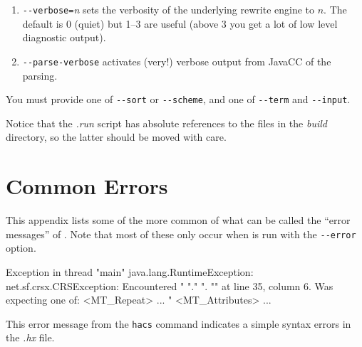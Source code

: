 \documentclass[11pt]{article} %
\begin{document}
\begin{manual}
\begin{enumerate}
  \item \verb"--verbose="\emph{n} sets the verbosity of the underlying \CRSX rewrite engine to $n$. The
    default is 0 (quiet) but 1--3 are useful (above 3 you get a lot of low level diagnostic output).

  \item \verb"--parse-verbose" activates (very!) verbose output from JavaCC of the parsing.

  \end{enumerate}
  You must provide one of \verb"--sort" or \verb"--scheme", and one of \verb"--term" and \verb"--input".

  Notice that the \emph{.run} script has absolute references to the files in the \emph{build}
  directory, so the latter should be moved with care.
\end{manual}




\section{Common Errors}\label{app:errors}

This appendix lists some of the more common of what can be called the ``error messages'' of
\HAX. Note that most of these only occur when \HAX is run with the \verb'--error' option.

\begin{error}\leavevmode
  \begin{code}
Exception in thread "main" java.lang.RuntimeException: net.sf.crsx.CRSException:
 Encountered " "." ". "" at line 35, column 6.
Was expecting one of:
    <MT_Repeat> ...
    "%
    <MT_Attributes> ...
  \end{code}
  This error message from the \verb'hacs' command indicates a simple syntax errors in the \emph{.hx}
  file.
\end{error}
\end{document}
